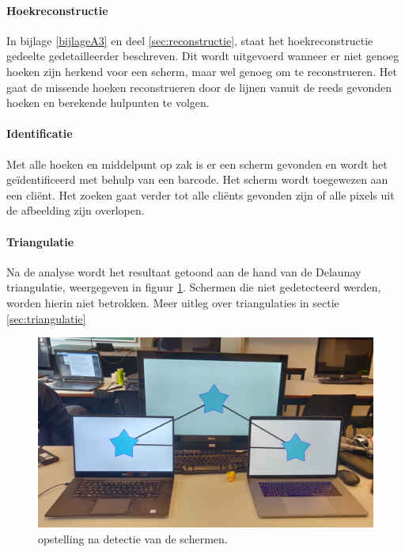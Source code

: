 \paragraph{Hoekreconstructie}
In bijlage \ref{bijlageA3} en deel \ref{sec:reconstructie}, staat het hoekreconstructie gedeelte gedetailleerder beschreven. Dit wordt uitgevoerd wanneer er niet genoeg hoeken zijn herkend voor een scherm, maar wel genoeg om te reconstrueren. Het gaat de missende hoeken reconstrueren door de lijnen vanuit de reeds gevonden hoeken en berekende hulpunten te volgen.

\paragraph{Identificatie}
Met alle hoeken en middelpunt op zak is er een scherm gevonden en wordt het geïdentificeerd met behulp van een barcode. Het scherm wordt toegewezen aan een cliënt. Het zoeken gaat verder tot alle cliënts gevonden zijn of alle pixels uit de afbeelding zijn overlopen.

\paragraph{Triangulatie}
Na de analyse wordt het resultaat getoond aan de hand van de Delaunay triangulatie, weergegeven in figuur \ref{fig:triang}. Schermen die niet gedetecteerd werden, worden hierin niet betrokken. Meer uitleg over triangulaties in sectie \ref{sec:triangulatie}
\begin{figure}[H]
	\centering
	\includegraphics[scale=0.09]{img/triang.jpg}
	\caption{opstelling na detectie van de schermen.}
	\label{fig:triang}
\end{figure}

